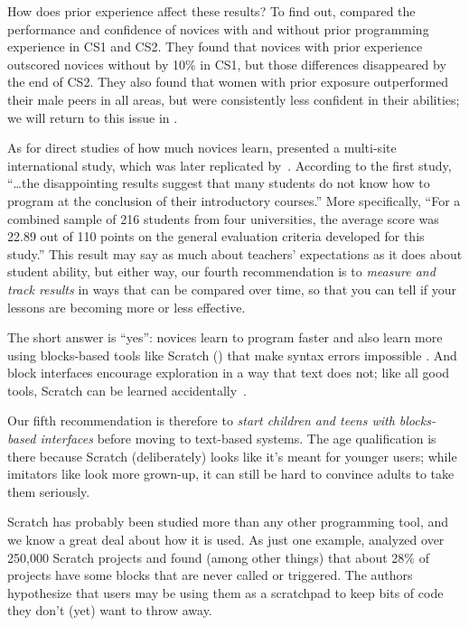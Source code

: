 How does prior experience affect these results? To find out,
\cite{Wilc2018} compared the performance and confidence of novices
with and without prior programming experience in CS1 and CS2. They found
that novices with prior experience outscored novices without by 10\% in
CS1, but those differences disappeared by the end of CS2. They also
found that women with prior exposure outperformed their male peers in
all areas, but were consistently less confident in their abilities; we
will return to this issue in .

As for direct studies of how much novices learn, \cite{McCr2001}
presented a multi-site international study, which was later replicated
by~\cite{Utti2013}. According to the first study, ``{\ldots}the
disappointing results suggest that many students do not know how to
program at the conclusion of their introductory courses.'' More
specifically, ``For a combined sample of 216 students from four
universities, the average score was 22.89 out of 110 points on the
general evaluation criteria developed for this study.'' This result may
say as much about teachers' expectations as it does about student
ability, but either way, our fourth recommendation is to \emph{measure and
track results} in ways that can be compared over time, so that you can
tell if your lessons are becoming more or less effective.


The short answer is ``yes'': novices learn to program faster and also
learn more using blocks-based tools like Scratch
() that make syntax errors impossible
\cite{Wein2017b}. And block interfaces encourage exploration in a way
that text does not; like all good tools, Scratch can be learned
accidentally~\cite{Malo2010}.

Our fifth recommendation is therefore to \emph{start children and teens
with blocks-based interfaces} before moving to text-based systems. The
age qualification is there because Scratch (deliberately) looks like
it's meant for younger users; while imitators like 
look more grown-up, it can still be hard to convince adults to take
them seriously.


Scratch has probably been studied more than any other programming tool,
and we know a great deal about how it is used. As just one example,
\cite{Aiva2016} analyzed over 250,000 Scratch projects and found
(among other things) that about 28\% of projects have some blocks that
are never called or triggered. The authors hypothesize that users may be
using them as a scratchpad to keep bits of code they don't (yet) want to
throw away.

